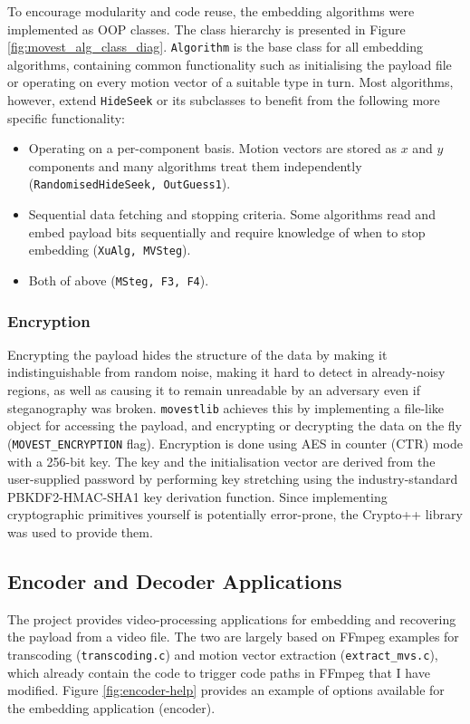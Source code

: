 \documentclass[12pt,british,twoside,notitlepage,usenames,dvipsnames,hypens,final]{report}
\numberwithin{equation}{section}
\numberwithin{figure}{section}
\begin{document}
To encourage modularity and code reuse, the embedding algorithms were implemented as OOP classes. The class hierarchy is presented in Figure \ref{fig:movest_alg_class_diag}. \texttt{Algorithm} is the base class for all embedding algorithms, containing common functionality such as initialising the payload file or operating on every motion vector of a suitable type in turn. Most algorithms, however, extend \texttt{HideSeek} or its subclasses to benefit from the following more specific functionality:

\begin{itemize}
\item Operating on a per-component basis. Motion vectors are stored as $x$ and $y$ components and many algorithms treat them independently (\texttt{RandomisedHideSeek, OutGuess1}).
\item Sequential data fetching and stopping criteria. Some algorithms read and embed payload bits sequentially and require knowledge of when to stop embedding (\texttt{XuAlg, MVSteg}).
\item Both of above (\texttt{MSteg, F3, F4}).
\end{itemize}

\subsubsection{Encryption}
\label{encryption}
Encrypting the payload hides the structure of the data by making it indistinguishable from random noise, making it hard to detect in already-noisy regions, as well as causing it to remain unreadable by an adversary even if steganography was broken. \texttt{movestlib} achieves this by implementing a file-like object for accessing the payload, and encrypting or decrypting the data on the fly (\texttt{MOVEST\_ENCRYPTION} flag). Encryption is done using AES in counter (CTR) mode with a 256-bit key. The key and the initialisation vector are derived from the user-supplied password by performing key stretching using the industry-standard PBKDF2-HMAC-SHA1 key derivation function. Since implementing cryptographic primitives yourself is potentially error-prone, the Crypto++ library was used to provide them. 

\subsection{Encoder and Decoder Applications}
\label{enc-dec-bin}
The project provides video-processing applications for embedding and recovering the payload from a video file. The two are largely based on FFmpeg examples for transcoding (\texttt{transcoding.c}) and motion vector extraction (\texttt{extract\_mvs.c}), which already contain the code to trigger code paths in FFmpeg that I have modified. Figure \ref{fig:encoder-help} provides an example of options available for the embedding application (encoder).
\end{document}
